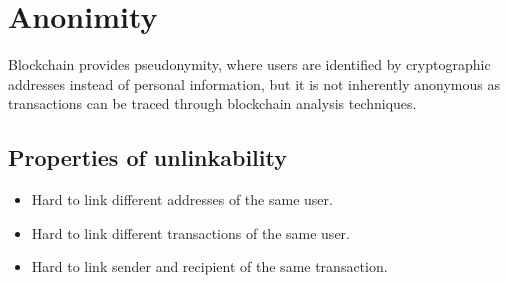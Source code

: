 \documentclass{article}
\begin{document}
\section{Anonimity}
Blockchain provides pseudonymity, where users are identified by cryptographic addresses instead of personal information, but it is not inherently anonymous as transactions can be traced through blockchain analysis techniques.
\subsection{Properties of unlinkability}
\begin{itemize}
    \item Hard to link different addresses of the same user.
    \item Hard to link different transactions of the same user.
    \item Hard to link sender and recipient of the same transaction.
\end{itemize}
\end{document}
